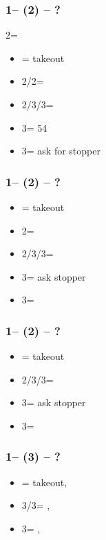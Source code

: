 \documentclass[12pt, a4paper]{report}
\begin{document}
{{{            \subsubsection*{1\clubs -- (2\diams) -- ?}
            2\diams = \diams
            \begin{itemize}
                \item \dbl = takeout
                \item 2\hearts/2\spades = \nat\ \nf
                \item 2\nt/3\diams/3\hearts = \trsf{\clubs/\hearts/\spades}\ \invp
                \item 3\clubs = 54\major\ \gf
                \item 3\spades = ask for \diams stopper
            \end{itemize}

            \subsubsection*{1\clubs -- (2\hearts) -- ?}
            \begin{itemize}
                \item \dbl = takeout
                \item 2\spades = \nat\ \nf
                \item 2\nt/3\clubs/3\hearts = \trsf{\clubs/\diams/\spades}\ \invp
                \item 3\diams = ask stopper
                \item 3\spades = \minor
            \end{itemize}

            \subsubsection*{1\clubs -- (2\spades) -- ?}
            \begin{itemize}
                \item \dbl = takeout
                \item 2\nt/3\clubs/3\diams = \trsf{\clubs/\diams/\hearts}\ \invp
                \item 3\hearts = ask stopper
                \item 3\spades = \minor
            \end{itemize}

            \subsubsection*{1\clubs -- (3\clubs) -- ?}
            \begin{itemize}
                \item \dbl = takeout, \gf
                \item 3\diams/3\hearts = \trsf{\hearts/\spades}, \invp
                \item 3\spades = \trsf{\diams}, \gf
            \end{itemize}

}}}
\end{document}
